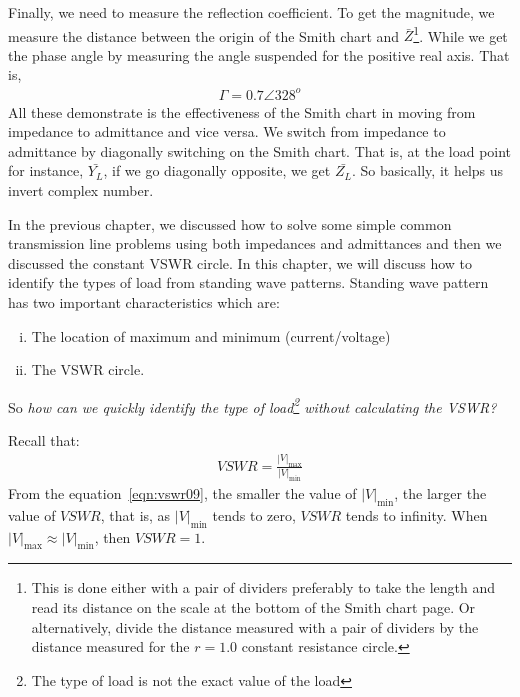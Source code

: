 \begin{exmp}
Finally, we need to measure the reflection coefficient. To get the magnitude, we measure the distance between the origin of the Smith chart and $\bar{Z}$\footnote{
This is done either with a pair of dividers preferably to take the length and read its distance on the scale at the bottom of the Smith chart page. Or alternatively, divide the distance measured with a pair of dividers by the distance measured for the $r = 1.0$ constant resistance circle.
}. While we get the phase angle by measuring the angle suspended for the positive real axis. That is,
\begin{align*}
\Gamma = 0.7\angle328^o
\end{align*}
All these demonstrate is the effectiveness of the Smith chart in moving from impedance to admittance and vice versa. We switch from impedance to admittance by diagonally switching on the Smith chart. That is, at the load point for instance, $\bar{Y_{L}}$, if we go diagonally opposite, we get $\bar{Z_{L}}$. So basically, it helps us invert complex number. 
\end{exmp}

In the previous chapter, we discussed how to solve some simple common transmission line problems using both impedances and admittances and then we discussed the constant VSWR circle. In this chapter, we will discuss how to identify the types of load from standing wave patterns. Standing wave pattern has two important characteristics which are:
\begin{enumerate}[(i)]
\item The location of maximum and minimum (current/voltage)
\item The VSWR circle.
\end{enumerate}
So \emph{how can we quickly identify the type of load\footnote{The type of load is not the exact value of the load} without calculating the VSWR?}

Recall that:
\begin{align}
VSWR = \frac{|V|_\max}{|V|_\min}
\label{eqn:vswr09}
\end{align}
From the equation~\eqref{eqn:vswr09}, the smaller the value of $|V|_\min$, the larger the value of ${VSWR}$, that is, as $|V|_\min$ tends to zero, ${VSWR}$ tends to infinity. When $|V|_\max{\approx}|V|_\min$, then $VSWR = 1$.

